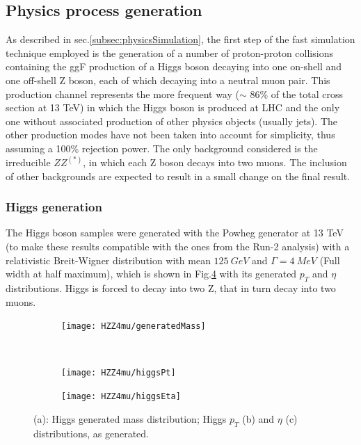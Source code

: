 \documentclass[a4paper,twoside,12pt]{article}
\begin{document}
\subsection{Physics process generation}
As described in sec.\ref{subsec:physicsSimulation}, the first step of the fast simulation 
technique employed is the generation of a number of proton-proton collisions containing the
ggF production of a Higgs boson decaying into one on-shell and one off-shell Z boson, 
each of which decaying into a neutral muon pair. This production channel represents the more
frequent way ($\sim$ 86\% of the total cross section at 13 TeV) in which the Higgs boson is produced at LHC and the only one without 
associated production of other physics objects (usually jets). The other production modes have not been taken
into account for simplicity, thus assuming a 100\% rejection power. The only background considered is the irreducible $ZZ^{(*)}$, 
in which each Z boson decays into two muons. The inclusion of other backgrounds are expected to 
result in a small change on the final result\cite{scoping}.

\subsubsection{Higgs generation}

The Higgs boson samples were generated with the Powheg generator at 13 TeV (to make these results compatible with the ones from the
Run-2 analysis) with a 
relativistic Breit-Wigner distribution with mean $125\ GeV$ and $\Gamma = 4\ MeV$ (Full
width at half maximum), which 
is shown in Fig.\ref{fig:HZZ4mu:generatedHiggs} with its generated $p_T$ and $\eta$ distributions. Higgs
is forced to decay into two Z, that in turn decay into two muons.\\

\begin{figure}
\begin{subfigure}{.5\linewidth}
\texttt{[image: HZZ4mu/generatedMass]}
\caption{}
\label{fig:HZZ4mu:generatedHiggs}
\end{subfigure}\\[1ex]
\begin{subfigure}{.5\linewidth}
\centering
\texttt{[image: HZZ4mu/higgsPt]}
\caption{}
\label{fig:HZZ4mu:higgsPt}
\end{subfigure}
\begin{subfigure}{.5\linewidth}
\centering
\texttt{[image: HZZ4mu/higgsEta]}
\caption{}
\label{fig:HZZ4mu:higgsEta}
\end{subfigure}
\caption{(a): Higgs generated mass distribution;	Higgs $p_{T}$ (b) and $\eta$ (c) distributions, as generated.}
\label{fig:HZZ4mu:generatedHiggs}
\end{figure}
\end{document}
